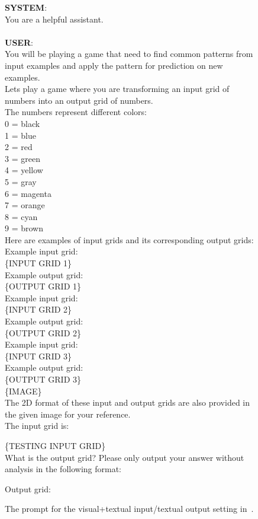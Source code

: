 \begin{figure*}
  \begin{tcolorbox}
  \textbf{SYSTEM}:\\
  You are a helpful assistant.\\\\
  \textbf{USER}: \\
        You will be playing a game that need to find common patterns from input examples and apply the pattern for prediction on new examples.\\
Lets play a game where you are transforming an input grid of numbers into an output grid of numbers.\\

The numbers represent different colors:\\
0 = black\\
1 = blue\\
2 = red\\
3 = green\\
4 = yellow\\
5 = gray\\
6 = magenta\\
7 = orange\\
8 = cyan\\
9 = brown\\

Here are examples of input grids and its corresponding output grids:\\
Example input grid:\\
\{INPUT GRID 1\} \\
Example output grid:\\
\{OUTPUT GRID 1\} \\

Example input grid:\\
\{INPUT GRID 2\} \\
Example output grid:\\
\{OUTPUT GRID 2\} \\

Example input grid:\\
\{INPUT GRID 3\} \\
Example output grid:\\
\{OUTPUT GRID 3\} \\

\{IMAGE\} \\

The 2D format of these input and output grids are also provided in the given image for your reference. \\

The input grid is:

\{TESTING INPUT GRID\} \\

What is the output grid? Please only output your answer without analysis in the following format:

Output grid:

    \end{tcolorbox}
    \caption{The prompt for the visual+textual input/textual output setting in~.}
    \label{fig:visual+textual prompt1}
\end{figure*}


